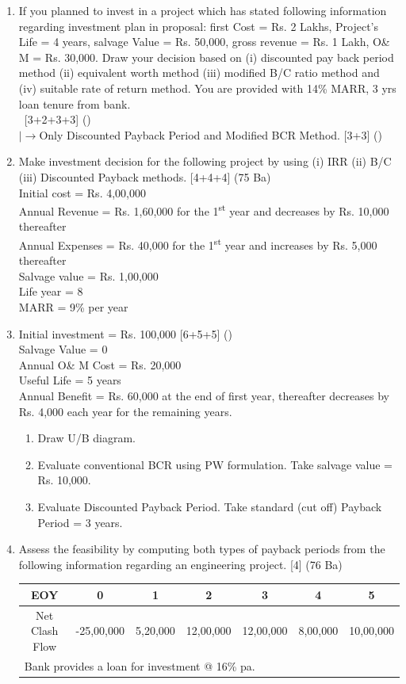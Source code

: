 \documentclass[12pt]{article}
\newcommand{\lb}{\\ $\left|\rightarrow\right.$}
\newcommand{\enter}{\\\textcolor{white}{1}}
\newcommand{\super}[1]{\textsuperscript{#1}}
\begin{document}
\begin{enumerate}
				\item If you planned to invest in a project which has stated following information regarding investment plan in proposal: first Cost = Rs. 2 Lakhs, Project's Life = 4 years, salvage Value = Rs. 50,000, gross revenue = Rs. 1 Lakh, O\& M = Rs. 30,000. Draw your decision based on (i) discounted pay back period method (ii) equivalent worth method (iii) modified B/C ratio method and (iv) suitable rate of return method. You are provided with 14\% MARR, 3 yrs loan tenure from bank. 
				\enter\hfill [3+2+3+3] ()
				\lb Only Discounted Payback Period and Modified BCR Method. \hfill [3+3] ()

				\item Make investment decision for the following project by using (i) IRR (ii) B/C (iii) Discounted Payback methods. \hfill [4+4+4] (75 Ba)\\
				Initial cost = Rs. 4,00,000\\
				Annual Revenue = Rs. 1,60,000 for the 1\super{st} year and decreases by Rs. 10,000 thereafter\\
				Annual Expenses = Rs. 40,000 for the 1\super{st} year and increases by Rs. 5,000 thereafter\\
				Salvage value = Rs. 1,00,000\\
				Life year = 8\\
				MARR = 9\% per year

				\item Initial investment = Rs. 100,000 \hfill [6+5+5] ()\\
				Salvage Value = 0\\
				Annual O\& M Cost = Rs. 20,000\\
				Useful Life = 5 years\\
				Annual Benefit = Rs. 60,000 at the end of first year, thereafter decreases by Rs. 4,000 each year for the remaining years.
				\begin{enumerate}[noitemsep, topsep = 0pt, label = \alph*.]
					\item Draw U/B diagram.
					\item Evaluate conventional BCR using PW formulation. Take salvage value = Rs. 10,000.
					\item Evaluate Discounted Payback Period. Take standard (cut off) Payback Period = 3 years.
				\end{enumerate}
				
				\item Assess the feasibility by computing both types of payback periods from the following information regarding an engineering project. \hfill [4] (76 Ba)\\
			\begin{tabular}{|c|c|c|c|c|c|c|}
				\hline
				EOY & 0 & 1 & 2 & 3 & 4 & 5\\ \hline
				Net Clash Flow & -25,00,000 & 5,20,000 & 12,00,000 & 12,00,000 & 8,00,000 & 10,00,000\\ \hline
				\multicolumn{7}{|l|}{Bank provides a loan for investment @ 16\% pa.}\\ \hline
			\end{tabular}


\end{enumerate}
\end{document}
